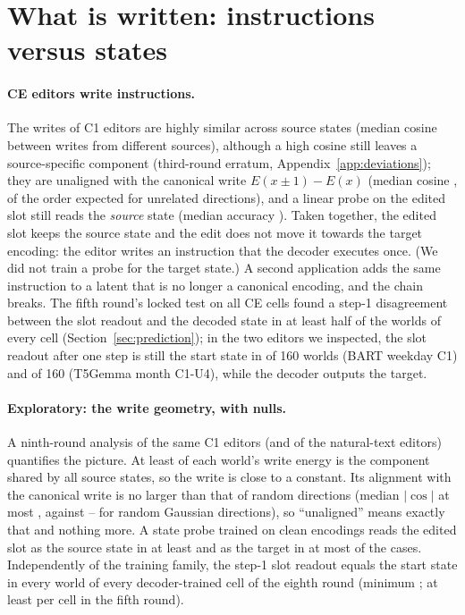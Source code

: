 \section{What is written: instructions versus states}\label{sec:instructions}
\paragraph{CE editors write instructions.}
The writes of C1 editors are highly similar across source states (median cosine \CLtwoWriteCosSource{} between writes from
different sources), although a high cosine still leaves a source-specific component (third-round erratum, Appendix~\ref{app:deviations});
they are unaligned with the canonical write $E(x\pm1)-E(x)$ (median cosine \CLtwoWriteCosCanon{}, of the order expected for unrelated
directions), and a linear probe on the edited slot still reads the \emph{source} state (median accuracy \CLtwoProbeSource{}). Taken
together, the edited slot keeps the source state and the edit does not move it towards the target encoding: the editor writes an
instruction that the decoder executes once. (We did not train a probe for the target state.) A second application adds the same instruction to a
latent that is no longer a canonical encoding, and the chain breaks. The fifth round's locked test on all \CLtwoCECells{} CE cells found a step-1 disagreement between the slot readout and the decoded
state in at least half of the worlds of every cell (Section~\ref{sec:prediction}); in the two editors we inspected, the slot readout
after one step is still the start state in \CLtwoSlotStaysBart{} of 160 worlds (BART weekday C1) and \CLtwoSlotStaysTfive{} of 160
(T5Gemma month C1-U4), while the decoder outputs the target.

\paragraph{Exploratory: the write geometry, with nulls.}
A ninth-round analysis of the same C1 editors (and of the natural-text editors) quantifies the picture. At least \CLtwentysixConstMin{}
of each world's write energy is the component shared by all source states, so the write is close to a constant. Its alignment with the
canonical write is no larger than that of random directions (median $|\cos|$ at most \CLtwentysixCosHi{}, against
\CLtwentysixNullLo{}--\CLtwentysixNullHi{} for random Gaussian directions), so ``unaligned'' means exactly that and nothing more. A
state probe trained on clean encodings reads the edited slot as the source state in at least \CLtwentysixSrcMin{} and as the target in at
most \CLtwentysixTgtMax{} of the cases. Independently of the training family, the step-1 slot readout equals the start state in every
world of every decoder-trained cell of the eighth round (minimum \CLtwentysixStartVeight{}; at least \CLtwentysixStartVfive{} per cell in
the fifth round).

